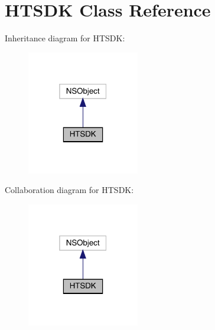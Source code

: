 \hypertarget{interface_h_t_s_d_k}{}\section{H\+T\+S\+DK Class Reference}
\label{interface_h_t_s_d_k}


Inheritance diagram for H\+T\+S\+DK\+:\nopagebreak
\begin{figure}[H]
\begin{center}
\leavevmode
\includegraphics[width=139pt]{interface_h_t_s_d_k__inherit__graph}
\end{center}
\end{figure}


Collaboration diagram for H\+T\+S\+DK\+:\nopagebreak
\begin{figure}[H]
\begin{center}
\leavevmode
\includegraphics[width=139pt]{interface_h_t_s_d_k__coll__graph}
\end{center}
\end{figure}
